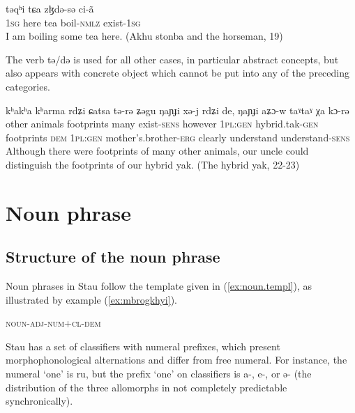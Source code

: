 \documentclass[oneside,a4paper,11pt]{article}
\newcommand{\ipa}[1]{{\phon #1}} %
\begin{document}
\begin{exe}
\ex \label{ex:tea}
\gll \ipa{ŋa} 	\ipa{təqʰi} 	\ipa{tɕa} 	\ipa{zɮdə-sə} 	\ipa{ci-ã} \\
\textsc{1sg} here tea boil-\textsc{nmlz} exist-\textsc{1sg} \\
\glt I am boiling some tea here. (Akhu stonba and the horseman, 19)
\end{exe}

The verb \ipa{tə/də} is used for all other cases, in particular abstract concepts, but also appears with concrete object which cannot be put into any of the preceding categories.

\begin{exe}
\ex \label{ex:kharma}
\gll
\ipa{kʰakʰa} 	\ipa{kʰarma} 	\ipa{rdʑi} 	\ipa{ɕatsa} 	\ipa{tə-rə} 	\ipa{ʑəgu} \ipa{ŋaɲɟi} 	\ipa{xə-j} 	\ipa{rdʑi} 	\ipa{de,} 	\ipa{ŋaɲɟi} 	\ipa{aʑɔ-w} 	\ipa{taˠtaˠ} 	\ipa{χa} 	\ipa{kɔ-rə} \\
other animals footprints many exist-\textsc{sens} however \textsc{1pl:gen} hybrid.tak-\textsc{gen} footprints \textsc{dem} \textsc{1pl:gen} mother's.brother-\textsc{erg} clearly understand understand-\textsc{sens} \\
\glt Although there were footprints of many other animals, our uncle could distinguish the footprints of our hybrid yak. (The hybrid yak, 22-23)
\end{exe}

 
 \section{Noun phrase}

\subsection{Structure of the noun phrase}
Noun phrases in Stau follow the template given in (\ref{ex:noun.templ}), as illustrated by example (\ref{ex:mbrogkhyi}). 

\begin{exe}
\ex \label{ex:noun.templ}
\glt \textsc{noun-adj-num+cl-dem}
\end{exe}

Stau has a set of classifiers with numeral prefixes, which present morphophonological alternations and differ from free numeral. For instance, the numeral `one' is \ipa{ru}, but the prefix `one' on classifiers is \ipa{a-}, \ipa{e-}, or \ipa{ə-} (the distribution of the three allomorphs in not completely predictable synchronically).
\end{document}
